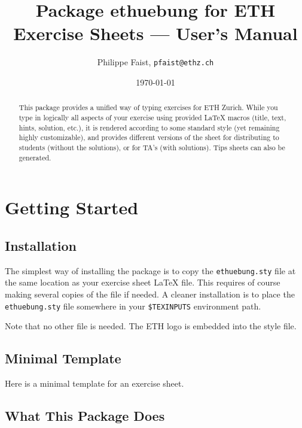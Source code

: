 \documentclass[11pt,a4paper]{article}
\title{Package {\fontseries{m}\selectfont ethuebung} for ETH Exercise Sheets --- User's Manual}
\author{Philippe Faist, \texttt{pfaist{@}ethz.ch}}
\date\today
\begin{document}
\maketitle

\renewcommand{\abstractname}{}
\setlength{\noteabstracttextwidth}{0.95\textwidth}
\renewcommand{\noteabstracttextfont}{\small}
\begin{abstract}
This package provides a unified way of typing exercises for ETH Zurich. While you type in
logically all aspects of your exercise using provided \LaTeX{} macros (title, text, hints,
solution, etc.), it is rendered according to some standard style (yet remaining highly
customizable), and provides different versions of the sheet for distributing to students
(without the solutions), or for TA's (with solutions). Tips sheets can also be generated.
\end{abstract}

{\small
\inlinetoc
}

\section{Getting Started}

\subsection{Installation}

The simplest way of installing the \ethuebung{} package is to copy the
\texttt{ethuebung.sty} file at the same location as your exercise sheet \LaTeX{} file. This
requires of course making several copies of the file if needed.
A cleaner installation is to place the \texttt{ethuebung.sty} file somewhere in your
\texttt{\$TEXINPUTS} environment path.

Note that no other file is needed. The ETH logo is embedded into the style file.


\subsection{Minimal Template}
\label{sec:minimaltemplate}

Here is a minimal template for an exercise sheet.

\begin{pkgverbatim}%
%
\end{pkgverbatim}


\subsection{What This Package Does}
\end{document}
